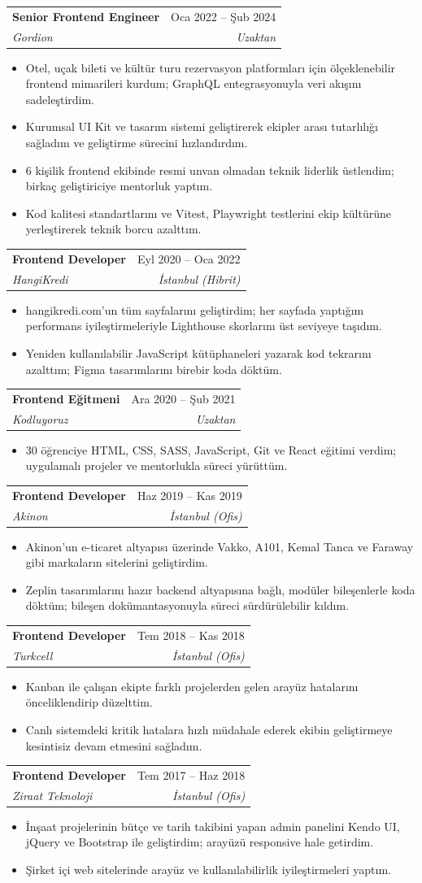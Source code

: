 \documentclass[a4paper,11pt]{article}
\makeatletter
\newcommand{\resumeItem}[1]{
  \item\small{
    {#1 \vspace{-2pt}}
  }
}
\newcommand{\resumeSubheading}[4]{
  \vspace{-2pt}\item
    \begin{tabular*}{0.97\textwidth}[t]{l@{\extracolsep{\fill}}r}
      \textbf{#1} & \small #2 \\
      \textit{\small#3} & \textit{\small #4} \\
    \end{tabular*}\vspace{-7pt}
}
\newcommand{\resumeItemListStart}{\begin{itemize}}
\newcommand{\resumeItemListEnd}{\end{itemize}\vspace{3pt}}
\makeatother
\begin{document}
    \resumeSubheading
      {Senior Frontend Engineer}{Oca 2022 -- Şub 2024}
      {Gordion}{Uzaktan}
      \resumeItemListStart
        \resumeItem{Otel, uçak bileti ve kültür turu rezervasyon platformları için ölçeklenebilir frontend mimarileri kurdum; GraphQL entegrasyonuyla veri akışını sadeleştirdim.}
        \resumeItem{Kurumsal UI Kit ve tasarım sistemi geliştirerek ekipler arası tutarlılığı sağladım ve geliştirme sürecini hızlandırdım.}
        \resumeItem{6 kişilik frontend ekibinde resmi unvan olmadan teknik liderlik üstlendim; birkaç geliştiriciye mentorluk yaptım.}
        \resumeItem{Kod kalitesi standartlarını ve Vitest, Playwright testlerini ekip kültürüne yerleştirerek teknik borcu azalttım.}
      \resumeItemListEnd

    \resumeSubheading
      {Frontend Developer}{Eyl 2020 -- Oca 2022}
      {HangiKredi}{İstanbul (Hibrit)}
      \resumeItemListStart
        \resumeItem{hangikredi.com'un tüm sayfalarını geliştirdim; her sayfada yaptığım performans iyileştirmeleriyle Lighthouse skorlarını üst seviyeye taşıdım.}
        \resumeItem{Yeniden kullanılabilir JavaScript kütüphaneleri yazarak kod tekrarını azalttım; Figma tasarımlarını birebir koda döktüm.}
      \resumeItemListEnd

    \resumeSubheading
      {Frontend Eğitmeni}{Ara 2020 -- Şub 2021}
      {Kodluyoruz}{Uzaktan}
      \resumeItemListStart
        \resumeItem{30 öğrenciye HTML, CSS, SASS, JavaScript, Git ve React eğitimi verdim; uygulamalı projeler ve mentorlukla süreci yürüttüm.}
      \resumeItemListEnd

    \resumeSubheading
      {Frontend Developer}{Haz 2019 -- Kas 2019}
      {Akinon}{İstanbul (Ofis)}
      \resumeItemListStart
        \resumeItem{Akinon'un e-ticaret altyapısı üzerinde Vakko, A101, Kemal Tanca ve Faraway gibi markaların sitelerini geliştirdim.}
        \resumeItem{Zeplin tasarımlarını hazır backend altyapısına bağlı, modüler bileşenlerle koda döktüm; bileşen dokümantasyonuyla süreci sürdürülebilir kıldım.}
      \resumeItemListEnd

    \resumeSubheading
      {Frontend Developer}{Tem 2018 -- Kas 2018}
      {Turkcell}{İstanbul (Ofis)}
      \resumeItemListStart
        \resumeItem{Kanban ile çalışan ekipte farklı projelerden gelen arayüz hatalarını önceliklendirip düzelttim.}
        \resumeItem{Canlı sistemdeki kritik hatalara hızlı müdahale ederek ekibin geliştirmeye kesintisiz devam etmesini sağladım.}
      \resumeItemListEnd

    \resumeSubheading
      {Frontend Developer}{Tem 2017 -- Haz 2018}
      {Ziraat Teknoloji}{İstanbul (Ofis)}
      \resumeItemListStart
        \resumeItem{İnşaat projelerinin bütçe ve tarih takibini yapan admin panelini Kendo UI, jQuery ve Bootstrap ile geliştirdim; arayüzü responsive hale getirdim.}
        \resumeItem{Şirket içi web sitelerinde arayüz ve kullanılabilirlik iyileştirmeleri yaptım.}
      \resumeItemListEnd
\end{document}
